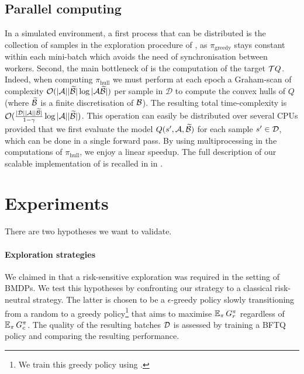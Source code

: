 \documentclass{article}
\begin{document}
\subsection{Parallel computing}
\label{subsec:parallel-computing}
In a simulated environment, a first process that can be distributed is the collection of samples in the exploration procedure of , as $\pi_\text{greedy}$ stays constant within each mini-batch which avoids the need of synchronisation between workers. Second, the main bottleneck of \BFTQ is the computation of the target $\mathcal{T} Q$. Indeed, when computing $\pi_\text{hull}$ we must perform at each epoch a Graham-scan of complexity $\mathcal{O}(|\mathcal{A}||\widetilde{\mathcal{B}}| \log |\mathcal{A}\widetilde{\mathcal{B}}|)$ per sample in $\mathcal{D}$ to compute the convex hulls of $Q$ (where $\widetilde{\mathcal{B}}$ is a finite discretisation of $\mathcal{B}$). The resulting total time-complexity is $\mathcal{O}(\frac{|\mathcal{D}||\mathcal{A}||\widetilde{\mathcal{B}}|}{1-\gamma} \log |\mathcal{A}||\widetilde{\mathcal{B}}|)$. This operation can easily be distributed over several CPUs provided that we first evaluate the model $Q(s',\mathcal{A},\widetilde{\mathcal{B}})$ for each sample $s'\in\mathcal{D}$, which can be done in a single forward pass. By using multiprocessing in the computations of $\pi_\text{hull}$, we enjoy a linear speedup.
The full description of our scalable implementation of \BFTQ is recalled in  in .

\section{Experiments}
\label{sec:experiements}
There are two hypotheses we want to validate.

\paragraph{Exploration strategies}\label{par:ex-explo} We claimed in  that a risk-sensitive exploration was required in the setting of BMDPs. We test this hypotheses by confronting our strategy to a classical risk-neutral strategy. The latter is chosen to be a $\epsilon$-greedy policy slowly transitioning from a random to a greedy policy\footnote{We train this greedy policy using \FTQ.} that aims to maximise $\operatorname*{\mathbb{E}}_{\pi} G_r^\pi$ regardless of $\operatorname*{\mathbb{E}}_{\pi} G_c^\pi$. The quality of the resulting batches $\mathcal{D}$ is assessed by training a BFTQ policy and comparing the resulting performance.
\end{document}
